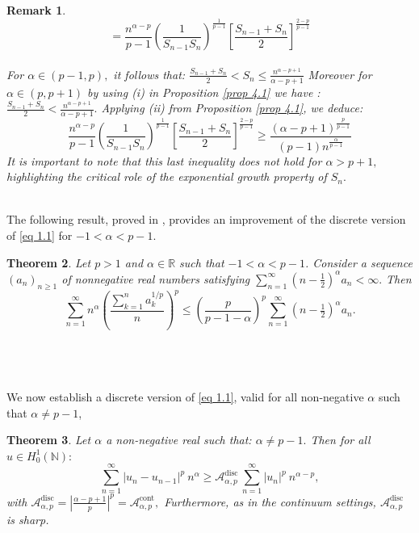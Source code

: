 \documentclass[11pt]{amsart}
\newtheorem{thm}{Theorem}[section]
\newtheorem{remark}[thm]{Remark}
\newcommand{\1}{[1]}
\begin{document}
\begin{remark}
$$= \frac{n^{\alpha-p}}{p-1} \left( \frac{1}{S_{n-1} S_{n}} \right)^{\frac{1}{p-1}} \left[ \frac{S_{n-1}+S_{n}}{2}\right]^{\frac{2-p}{p-1}} $$ 
\phantom{.} \\
For $\alpha \in (p-1,p),$ it follows that:
 $\frac{S_{n-1}+S_{n}}{2} <  S_{n}
\leq \frac{n^{\alpha-p+1}}{\alpha-p+1}$
Moreover for $\alpha \in (p,p+1)$ by using \textit{(i)} in Proposition \ref{prop 4.1} we have : $\frac{S_{n-1}+S_{n}}{2}
< \frac{n^{\alpha-p+1}}{\alpha-p+1}.$  Applying \textit{(ii)} from Proposition \ref{prop 4.1}, we deduce:
$$
\frac{n^{\alpha-p}}{p-1} \left( \frac{1}{S_{n-1} S_{n}} \right)^{\frac{1}{p-1}} \left[ \frac{S_{n-1}+S_{n}}{2}\right]^{\frac{2-p}{p-1}} 
\geq \frac{(\alpha-p+1)^{\frac{p}{p-1}}}{(p-1) n^{\frac{\alpha}{p-1}}} $$
It is important to note that this last inequality does not hold for $\alpha > p+1,$ highlighting the critical role of the exponential growth property of $S_{n}.$
\end{remark}
\phantom{.} \\
The following result, proved in \cite{Liu12}, provides an improvement of the discrete version of \eqref{eq 1.1} for $-1<\alpha<p-1$.
\begin{thm} \label{thm 4.5}
Let $p>1$ and $\alpha\in\mathbb{R}$ such that $-1<\alpha<p-1$. Consider a sequence $(a_n)_{n\ge1}$ of nonnegative real numbers satisfying $\displaystyle\sum_{n=1}^{\infty}\left(n-\tfrac12\right)^{\alpha}a_n<\infty.$
Then
\[
\sum_{n=1}^{\infty} n^{\alpha}
\left(
\frac{\displaystyle\sum_{k=1}^{n} a_k^{1/p}}{n}
\right)^p
\le
\left(\frac{p}{p-1-\alpha}\right)^p
\sum_{n=1}^{\infty}
\left(n-\tfrac12\right)^{\alpha} a_n .
\]
\end{thm}
\phantom{.}\\ \\ \\
We now establish a discrete version of \ref{eq 1.1}, valid for all non-negative \( \alpha \) such that \( \alpha \neq p - 1 \),
\begin{thm} \label{thm 4.6} Let $\alpha$ a non-negative real such that: $\alpha \neq p-1.$ Then for all $u \in H_0^{1}(\mathbb{N}):$
$$\sum_{n=1}^{\infty} |u_{n}-u_{n-1}|^{p} \ n^{\alpha}  \geq  \mathcal{A}^{\text{disc}}_{\alpha,p} \, \sum_{n=1}^{\infty} |u_{n}|^{p} \ n^{\alpha-p}, $$
with $\mathcal{A}^{\text{disc}}_{\alpha,p}  = \left|\frac{\alpha-p+1}{p} \right|^{p} = \mathcal{A}^{\text{cont}}_{\alpha,p} ,$ Furthermore, as in the continuum settings, $\mathcal{A}^{\text{disc}}_{\alpha,p} $ is sharp.
\end{thm}
\end{document}

